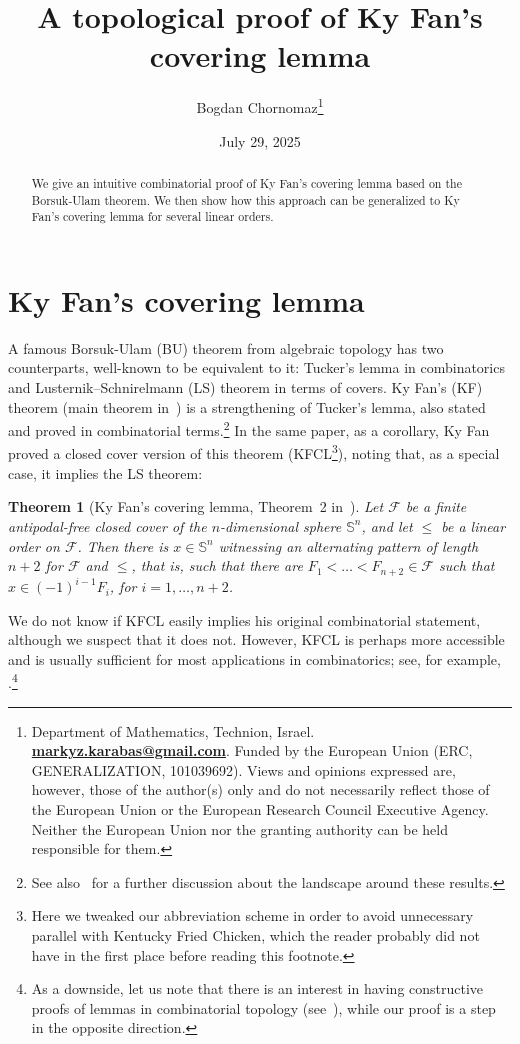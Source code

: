 \documentclass{article} %
\title{A topological proof of Ky Fan's covering lemma}
\author{Bogdan Chornomaz\footnote{Department of Mathematics, Technion, Israel. \href{mailto:markyz.karabas@gmail.com}{\bf markyz.karabas@gmail.com}. Funded by the European Union (ERC, GENERALIZATION, 101039692). Views and opinions expressed are, however, those of the author(s) only and do not necessarily reflect those of the European Union or the European Research Council Executive Agency. Neither the European Union nor the granting authority can be held responsible for them.}}
\date{July 29, 2025}
\newcommand{\F}{\mathcal{F}}
\renewcommand{\SS}{\mathbb{S}}
\newtheorem{theorem}{Theorem}
\begin{document}
\maketitle


\begin{abstract}
    We give an intuitive combinatorial proof of Ky Fan's covering lemma based on the Borsuk-Ulam theorem. We then show how this approach can be generalized to Ky Fan's covering lemma for several linear orders. 
\end{abstract}


\section{Ky Fan's covering lemma}\label{sec-ky-fan}
A famous Borsuk-Ulam (BU) theorem from algebraic topology has two counterparts, well-known to be equivalent to it: Tucker's lemma in combinatorics and Lusternik–Schnirelmann (LS) theorem in terms of covers. Ky Fan's (KF) theorem (main theorem in~\cite{kyfan52}) is a strengthening of Tucker's lemma, also stated and proved in combinatorial terms.\footnote{See also~\cite{nyman13} for a further discussion about the landscape around these results.} %
In the same paper, as a corollary, Ky Fan proved a closed cover version of this theorem (KFCL\footnote{Here we tweaked our abbreviation scheme in order to avoid unnecessary parallel with Kentucky Fried Chicken, which the reader probably did not have in the first place before reading this footnote.}), noting that, as a special case, it implies the LS theorem: 
\begin{theorem}[Ky Fan's covering lemma, Theorem~2 in~\cite{kyfan52}]\label{th-kyfan-covers}
	Let $\F$ be a finite antipodal-free closed cover of the $n$-dimensional sphere $\SS^n$, and let $\leq$ be a linear order on $\F$. Then there is $x\in \SS^n$ witnessing an alternating pattern of length $n+2$ for $\F$ and $\leq$, that is, such that there are $F_1 < \dots < F_{n+2} \in \F$ such that $x\in (-1)^{i-1}F_i$, for $i=1, \dots, n+2$. 
\end{theorem}

We do not know if KFCL easily implies his original combinatorial statement, although we suspect that it does not. However, KFCL is perhaps more accessible and is usually sufficient for most applications in combinatorics; see, for example, \cite{simonyi2006local}.\footnote{As a downside, let us note that there is an interest in having constructive proofs of lemmas in combinatorial topology (see~\cite{lz06,prescott05}), while our proof is a step in the opposite direction.}
\end{document}
